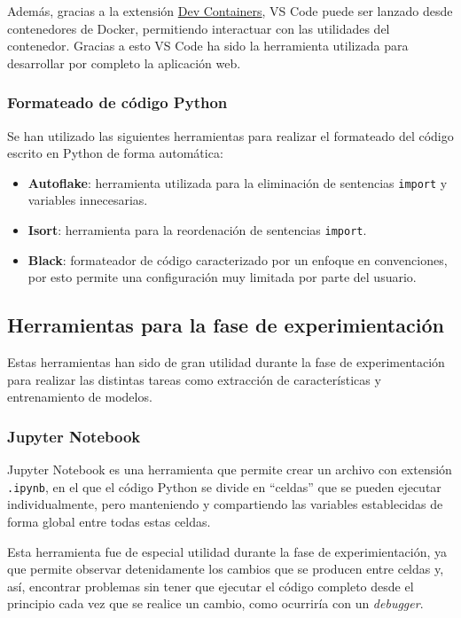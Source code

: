Además, gracias a la extensión
\href{https://marketplace.visualstudio.com/items?itemName=ms-vscode-remote.remote-containers}{Dev
Containers}, VS Code puede ser lanzado desde contenedores de Docker, permitiendo
interactuar con las utilidades del contenedor. Gracias a esto VS Code ha sido la
herramienta utilizada para desarrollar por completo la aplicación web.

\subsubsection{Formateado de código Python}

Se han utilizado las siguientes herramientas para realizar el formateado del
código escrito en Python de forma automática:

\begin{itemize}
      \item \textbf{Autoflake}: herramienta utilizada para la eliminación de
            sentencias \texttt{import} y variables innecesarias.
      \item \textbf{Isort}: herramienta para la reordenación de sentencias
            \texttt{import}.
      \item \textbf{Black}: formateador de código caracterizado por un enfoque
            en convenciones, por esto permite una configuración muy limitada por
            parte del usuario.
\end{itemize}

\subsection{Herramientas para la fase de experimientación}

Estas herramientas han sido de gran utilidad durante la fase de experimentación
para realizar las distintas tareas como extracción de características y
entrenamiento de modelos.

\subsubsection{Jupyter Notebook}

Jupyter Notebook es una herramienta que permite crear un archivo con extensión
\texttt{.ipynb}, en el que el código Python se divide en ``celdas'' que se
pueden ejecutar individualmente, pero manteniendo y compartiendo las variables
establecidas de forma global entre todas estas celdas.

Esta herramienta fue de especial utilidad durante la fase de experimientación,
ya que permite observar detenidamente los cambios que se producen entre celdas
y, así, encontrar problemas sin tener que ejecutar el código completo desde el
principio cada vez que se realice un cambio, como ocurriría con un
\textit{debugger}.

